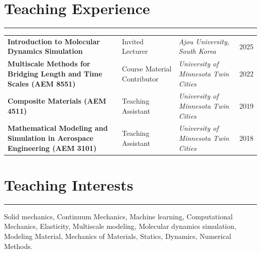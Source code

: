\documentclass[11pt]{article}
\begin{document}
\section*{Teaching Experience}\vspace{-0.7em}
\hrule
\vspace{1.0em}
\renewcommand{\arraystretch}{1.3}
\begin{tabularx}{\textwidth}{@{} l X X r @{}}

\parbox[t]{0.42\textwidth}{\textbf{Introduction to Molecular Dynamics Simulation}} & Invited Lecturer & \textit{Ajou University, South Korea} & 2025 \\

\parbox[t]{0.42\textwidth}{\textbf{Multiscale Methods for Bridging Length and Time Scales (AEM 8551)}} & Course Material Contributor & \textit{University of Minnesota Twin Cities} & 2022 \\

\parbox[t]{0.42\textwidth}{\textbf{Composite Materials (AEM 4511)}} & Teaching Assistant & \textit{University of Minnesota Twin Cities} & 2019 \\

\parbox[t]{0.42\textwidth}{\textbf{Mathematical Modeling and Simulation in Aerospace Engineering (AEM 3101)}} & Teaching Assistant & \textit{University of Minnesota Twin Cities} & 2018 


\end{tabularx}


\section*{Teaching Interests}\vspace{-0.7em}
\hrule
\vspace{0.8em}

Solid mechanics, Continuum Mechanics, Machine learning, Computational Mechanics,  Elasticity, Multiscale modeling, Molecular dynamics simulation, Modeling Material, Mechanics of Materials, Statics, Dynamics, Numerical Methods.
\end{document}
